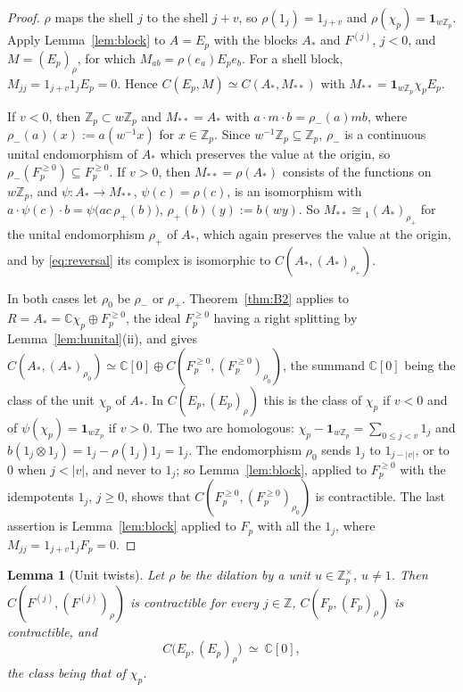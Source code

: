 \documentclass[11pt]{amsart}
\newtheorem{lemma}[theorem]{Lemma}
\theoremstyle{definition}
\theoremstyle{remark}
\newcommand{\C}{\mathbb C}
\newcommand{\Z}{\mathbb Z}
\begin{document}
\begin{proof}
$\rho$ maps the shell $j$ to the shell $j+v$, so $\rho(1_j)=1_{j+v}$ and
$\rho(\chi_p)=\mathbf 1_{w\Z_p}$.  Apply Lemma~\ref{lem:block} to $A=E_p$ with
the blocks $A_*$ and $F^{(j)}$, $j<0$, and $M=(E_p)_{\rho}$, for which
$M_{ab}=\rho(e_a)E_pe_b$.  For a shell block, $M_{jj}=1_{j+v}1_jE_p=0$.  Hence
$C(E_p,M)\simeq C(A_*,M_{**})$ with $M_{**}=\mathbf 1_{w\Z_p}\chi_pE_p$.

If $v<0$, then $\Z_p\subset w\Z_p$ and $M_{**}=A_*$ with $a\cdot m\cdot
b=\rho_{-}(a)mb$, where $\rho_{-}(a)(x):=a(w^{-1}x)$ for $x\in\Z_p$.  Since
$w^{-1}\Z_p\subseteq\Z_p$, $\rho_{-}$ is a continuous unital endomorphism of
$A_*$ which preserves the value at the origin, so
$\rho_{-}(F_p^{\ge0})\subseteq F_p^{\ge0}$.  If $v>0$, then $M_{**}=\rho(A_*)$
consists of the functions on $w\Z_p$, and $\psi:A_*\to M_{**}$,
$\psi(c)=\rho(c)$, is an isomorphism with
$a\cdot\psi(c)\cdot b=\psi\bigl(ac\,\rho_{+}(b)\bigr)$, $\rho_{+}(b)(y):=b(wy)$.  So
$M_{**}\cong{}_{1}(A_*)_{\rho_{+}}$ for the unital endomorphism $\rho_{+}$ of $A_*$,
which again preserves the value at the origin, and by \eqref{eq:reversal} its
complex is isomorphic to $C(A_*,(A_*)_{\rho_{+}})$.

In both cases let $\rho_{0}$ be $\rho_{-}$ or $\rho_{+}$.  Theorem~\ref{thm:B2} applies
to $R=A_*=\C\chi_p\oplus F_p^{\ge0}$, the ideal $F_p^{\ge0}$ having a right
splitting by Lemma~\ref{lem:hunital}(ii), and gives
$C(A_*,(A_*)_{\rho_{0}})\simeq\C[0]\oplus C(F_p^{\ge0},(F_p^{\ge0})_{\rho_{0}})$, the
summand $\C[0]$ being the class of the unit $\chi_p$ of $A_*$.  In
$C(E_p,(E_p)_{\rho})$ this is the class of $\chi_p$ if $v<0$ and of
$\psi(\chi_p)=\mathbf 1_{w\Z_p}$ if $v>0$.  The two are homologous:
$\chi_p-\mathbf 1_{w\Z_p}=\sum_{0\le j<v}1_j$ and
$b(1_j\otimes1_j)=1_j-\rho(1_j)1_j=1_j$.  The endomorphism $\rho_{0}$ sends
$1_j$ to $1_{j-|v|}$, or to $0$ when $j<|v|$, and never to $1_j$; so
Lemma~\ref{lem:block}, applied to $F_p^{\ge0}$ with the idempotents $1_j$,
$j\ge0$, shows that $C(F_p^{\ge0},(F_p^{\ge0})_{\rho_{0}})$ is contractible.  The
last assertion is Lemma~\ref{lem:block} applied to $F_p$ with all the $1_j$,
where $M_{jj}=1_{j+v}1_jF_p=0$.
\end{proof}

\begin{lemma}[Unit twists]\label{lem:unit}
Let $\rho$ be the dilation by a unit $u\in\Z_p^{\times}$, $u\ne1$.  Then
$C(F^{(j)},(F^{(j)})_{\rho})$ is contractible for every $j\in\Z$,
$C(F_p,(F_p)_{\rho})$ is contractible, and
\[
C\bigl(E_p,(E_p)_{\rho}\bigr)\ \simeq\ \C[0],
\]
the class being that of $\chi_p$.
\end{lemma}
\end{document}
